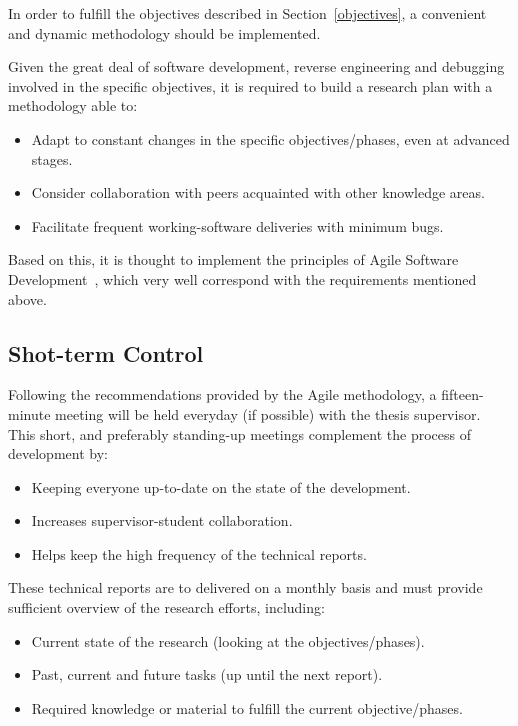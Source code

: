 In order to fulfill the objectives described in Section~\ref{objectives}, a convenient and dynamic methodology should be implemented.

Given the great deal of software development, reverse engineering and debugging involved in the specific objectives, it is required to build a research plan with a methodology able to: 
\begin{itemize}
	\item Adapt to constant changes in the specific objectives/phases, even at advanced stages.
	\item Consider collaboration with peers acquainted with other knowledge areas.
	\item Facilitate frequent working-software deliveries with minimum bugs.
\end{itemize}

Based on this, it is thought to implement the principles of Agile Software Development~\cite{agileAlliance,agileManifesto}, which very well correspond with the requirements mentioned above.

\subsection{Shot-term Control}\label{shot-termContol}
Following the recommendations provided by the Agile methodology, a fifteen-minute meeting will be held everyday (if possible) with the thesis supervisor. This short, and preferably standing-up meetings complement the process of development by:

\begin{itemize}
	\item Keeping everyone up-to-date on the state of the development.
	\item Increases supervisor-student collaboration.
	\item Helps keep the high frequency of the technical reports.
\end{itemize}

These technical reports are to delivered on a monthly basis and must provide sufficient overview of the research efforts, including:

\begin{itemize}
	\item Current state of the research (looking at the objectives/phases).
	\item Past, current and future tasks (up until the next report).
	\item Required knowledge or material to fulfill the current objective/phases.
\end{itemize}

